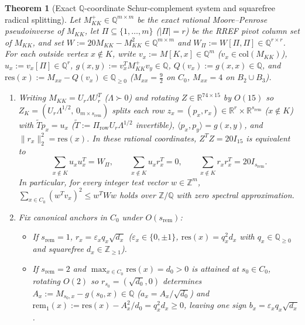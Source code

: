 \documentclass[11pt,reqno]{amsart}
\newtheorem{theorem}{Theorem}[section]
\theoremstyle{definition}
\theoremstyle{remark}
\numberwithin{equation}{section}
\numberwithin{table}{section}
\begin{document}
\begin{theorem}[Exact $\mathbb{Q}$-coordinate Schur-complement system and squarefree radical splitting]\label{thm:alg86_87}
Let $M_{KK}^+ \in \mathbb{Q}^{m \times m}$ be the exact rational Moore--Penrose pseudoinverse of $M_{KK}$, let $\Pi \subseteq \{1, \dots, m\}$ ($|\Pi| = r$) be the RREF pivot column set of $M_{KK}$, and set $W := 20 M_{KK} - M_{KK}^2 \in \mathbb{Q}^{m \times m}$ and $W_\Pi := W[\Pi, \Pi] \in \mathbb{Q}^{r \times r}$. For each outside vertex $x \notin K$, write $v_x := M[K, x] \in \mathbb{Q}^m$ ($v_x \in \mathrm{col}(M_{KK})$), $u_x := v_x[\Pi] \in \mathbb{Q}^r$, $g(x, y) := v_x^T M_{KK}^+ v_y \in \mathbb{Q}$, $Q(v_x) := g(x, x) \in \mathbb{Q}$, and $\mathrm{res}(x) := M_{xx} - Q(v_x) \in \mathbb{Q}_{\ge 0}$ ($M_{xx} = \frac{9}{2}$ on $C_0$, $M_{xx} = 4$ on $B_2 \cup B_3$).
\begin{enumerate}
  \item Writing $M_{KK} = U_r \Lambda U_r^T$ ($\Lambda \succ 0$) and rotating $Z \in \mathbb{R}^{74 \times 15}$ by $O(15)$ so $Z_K = (U_r \Lambda^{1/2},\, 0_{m \times s_{\mathrm{rem}}})$ splits each row $z_x = (p_x, r_x) \in \mathbb{R}^r \times \mathbb{R}^{s_{\mathrm{rem}}}$ ($x \notin K$) with $\tilde{T} p_x = u_x$ ($\tilde{T} := \Pi_{\mathrm{row}} U_r \Lambda^{1/2}$ invertible), $\langle p_x, p_y \rangle = g(x, y)$, and $\|r_x\|_2^2 = \mathrm{res}(x)$. In these rational coordinates, $Z^T Z = 20 I_{15}$ is equivalent to
  \begin{equation}\label{eq:qq_gram_master}
    \sum_{x \notin K} u_x u_x^T = W_\Pi, \qquad \sum_{x \notin K} u_x r_x^T = 0, \qquad \sum_{x \notin K} r_x r_x^T = 20 I_{s_{\mathrm{rem}}}.
  \end{equation}
  In particular, for every integer test vector $w \in \mathbb{Z}^m$, $\sum_{x \in C_0} (w^T v_x)^2 \le w^T W w$ holds over $\mathbb{Z}/\mathbb{Q}$ with zero spectral approximation.
  \item Fix canonical anchors in $C_0$ under $O(s_{\mathrm{rem}})$:
  \begin{itemize}
    \item If $s_{\mathrm{rem}} = 1$, $r_x = \varepsilon_x q_x \sqrt{d_x}$ ($\varepsilon_x \in \{0, \pm 1\}$, $\mathrm{res}(x) = q_x^2 d_x$ with $q_x \in \mathbb{Q}_{\ge 0}$ and squarefree $d_x \in \mathbb{Z}_{\ge 1}$).
    \item If $s_{\mathrm{rem}} = 2$ and $\max_{x \in C_0} \mathrm{res}(x) = d_0 > 0$ is attained at $s_0 \in C_0$, rotating $O(2)$ so $r_{s_0} = (\sqrt{d_0}, 0)$ determines $A_x := M_{s_0, x} - g(s_0, x) \in \mathbb{Q}$ ($a_x = A_x / \sqrt{d_0}$) and $\mathrm{rem}_1(x) := \mathrm{res}(x) - A_x^2 / d_0 = q_x^2 d_x \ge 0$, leaving one sign $b_x = \varepsilon_x q_x \sqrt{d_x}$.

\end{itemize}
\end{enumerate}
\end{theorem}
\end{document}
